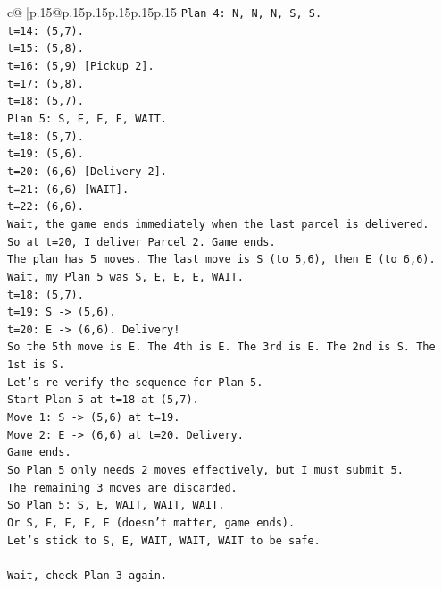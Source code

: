 \documentclass{article}
\begin{document}
{\begin{supertabular}{c@{$\;$}|p{.15\linewidth}@{}p{.15\linewidth}p{.15\linewidth}p{.15\linewidth}p{.15\linewidth}p{.15\linewidth}}
{{{\texttt{Plan 4: N, N, N, S, S.} \\
\texttt{t=14: (5,7).} \\
\texttt{t=15: (5,8).} \\
\texttt{t=16: (5,9) {[}Pickup 2{]}.} \\
\texttt{t=17: (5,8).} \\
\texttt{t=18: (5,7).} \\
\texttt{Plan 5: S, E, E, E, WAIT.} \\
\texttt{t=18: (5,7).} \\
\texttt{t=19: (5,6).} \\
\texttt{t=20: (6,6) {[}Delivery 2{]}.} \\
\texttt{t=21: (6,6) {[}WAIT{]}.} \\
\texttt{t=22: (6,6).} \\
\texttt{Wait, the game ends immediately when the last parcel is delivered.} \\
\texttt{So at t=20, I deliver Parcel 2. Game ends.} \\
\texttt{The plan has 5 moves. The last move is S (to 5,6), then E (to 6,6).} \\
\texttt{Wait, my Plan 5 was S, E, E, E, WAIT.} \\
\texttt{t=18: (5,7).} \\
\texttt{t=19: S {-}> (5,6).} \\
\texttt{t=20: E {-}> (6,6). Delivery!} \\
\texttt{So the 5th move is E. The 4th is E. The 3rd is E. The 2nd is S. The 1st is S.} \\
\texttt{Let's re{-}verify the sequence for Plan 5.} \\
\texttt{Start Plan 5 at t=18 at (5,7).} \\
\texttt{Move 1: S {-}> (5,6) at t=19.} \\
\texttt{Move 2: E {-}> (6,6) at t=20. Delivery.} \\
\texttt{Game ends.} \\
\texttt{So Plan 5 only needs 2 moves effectively, but I must submit 5.} \\
\texttt{The remaining 3 moves are discarded.} \\
\texttt{So Plan 5: S, E, WAIT, WAIT, WAIT.} \\
\texttt{Or S, E, E, E, E (doesn't matter, game ends).} \\
\texttt{Let's stick to S, E, WAIT, WAIT, WAIT to be safe.} \\
\\ 
\texttt{Wait, check Plan 3 again.} \\
}}}
\end{supertabular}}
\end{document}
